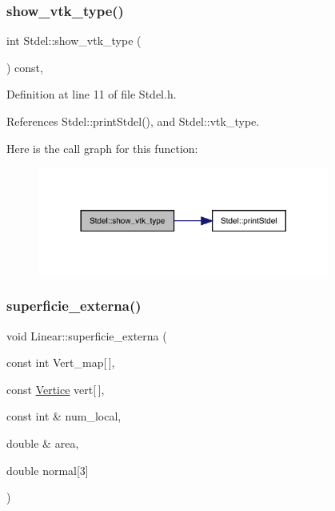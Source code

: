 \subsubsection{\texorpdfstring{show\+\_\+vtk\+\_\+type()}{show\_vtk\_type()}}
{\footnotesize\ttfamily int Stdel\+::show\+\_\+vtk\+\_\+type (\begin{DoxyParamCaption}{ }\end{DoxyParamCaption}) const\hspace{0.3cm}{\ttfamily [inline]}, {\ttfamily [inherited]}}



Definition at line 11 of file Stdel.\+h.



References Stdel\+::print\+Stdel(), and Stdel\+::vtk\+\_\+type.

Here is the call graph for this function\+:
\nopagebreak
\begin{figure}[H]
\begin{center}
\leavevmode
\includegraphics[width=272pt]{classStdel_a56288a857b95a55c8b7eb5b473e836d9_cgraph}
\end{center}
\end{figure}
\mbox{\label{classLinear_a33a083b6398f6ee6dfa090a7b10d8de1}} 
\subsubsection{\texorpdfstring{superficie\+\_\+externa()}{superficie\_externa()}}
{\footnotesize\ttfamily void Linear\+::superficie\+\_\+externa (\begin{DoxyParamCaption}\item[{const int}]{Vert\+\_\+map\mbox{[}$\,$\mbox{]},  }\item[{const \hyperlink{structVertice}{Vertice}}]{vert\mbox{[}$\,$\mbox{]},  }\item[{const int \&}]{num\+\_\+local,  }\item[{double \&}]{area,  }\item[{double}]{normal\mbox{[}3\mbox{]} }\end{DoxyParamCaption})\hspace{0.3cm}{\ttfamily [virtual]}}



